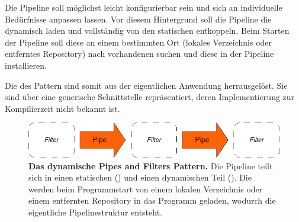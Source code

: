 Die Pipeline soll möglichst leicht konfigurierbar sein und sich an
individuelle Bedürfnisse anpassen lassen.
Vor diesem Hintergrund soll die Pipeline die  dynamisch laden und
vollständig von den statischen  entkoppeln.
Beim Starten der Pipeline soll diese an einem bestimmten Ort (lokales
Verzeichnis oder entferntes Repository) nach vorhandenen  suchen
und diese in der Pipeline installieren.

Die  des  Pattern sind somit aus der
eigentlichen Anwendung herrausgelöst. Sie sind über eine generische
Schnittstelle repräsentiert, deren Implementierung zur Kompilierzeit nicht
bekannt ist.

\begin{figure}[htbp]
	\begin{center}
		\includegraphics[scale=0.7]{pics/pipesFilter21.png}
	\caption[Pipes and Filter 2]{
	\textbf{Das dynamische Pipes and Filters Pattern.}
	Die Pipeline teilt sich in einen statischen () und einen
	dynamischen Teil ().
	Die  werden beim Programmstart von einem lokalen Verzeichnis oder
	einem entfernten Repository in das Programm geladen, wodurch die eigentliche
	Pipelinestruktur entsteht.
	}
	\end{center}
	\label{fig:pipesFilter21}
\end{figure}


